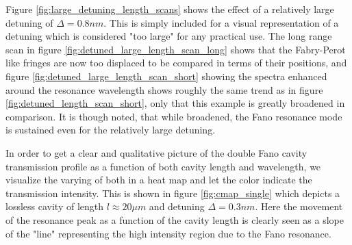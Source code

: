 Figure \ref{fig:large_detuning_length_scans} shows the effect of a relatively large detuning of $\Delta = 0.8nm$. This is simply included for a visual representation of a detuning which is considered "too large" for any practical use. The long range scan in figure \ref{fig:detuned_large_length_scan_long} shows that the Fabry-Perot like fringes are now too displaced to be compared in terms of their positions, and figure \ref{fig:detuned_large_length_scan_short} showing the spectra enhanced around the resonance wavelength shows roughly the same trend as in figure \ref{fig:detuned_length_scan_short}, only that this example is greatly broadened in comparison. It is though noted, that while broadened, the Fano resonance mode is sustained even for the relatively large detuning.

In order to get a clear and qualitative picture of the double Fano cavity transmission profile as a function of both cavity length and wavelength, we visualize the varying of both in a heat map and let the color indicate the transmission intensity. This is shown in figure \ref{fig:cmap_single} which depicts a lossless cavity of length $l\approx 20 \mu m$ and detuning $\Delta = 0.3nm$. Here the movement of the resonance peak as a function of the cavity length is clearly seen as a slope of the "line" representing the high intensity region due to the Fano resonance. 

